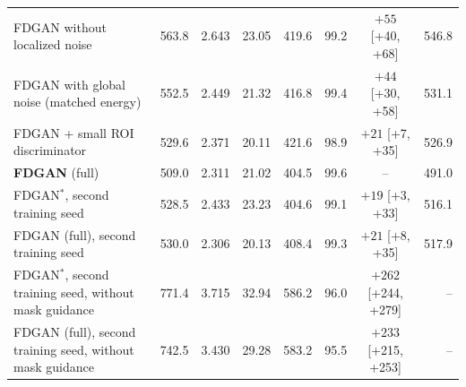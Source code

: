 \begin{center}
\begin{minipage}{\textwidth}
{\begin{tabular}{lrrrrrcr}
FDGAN without localized noise & 563.8 & 2.643 & 23.05 & 419.6 & 99.2 & $+55$ [+40, +68] & 546.8 \\
FDGAN with global noise (matched energy) & 552.5 & 2.449 & 21.32 & 416.8 & 99.4 & $+44$ [+30, +58] & 531.1 \\
FDGAN + small ROI discriminator & 529.6 & 2.371 & 20.11 & 421.6 & 98.9 & $+21$ [+7, +35] & 526.9 \\
\textbf{FDGAN} (full) & 509.0 & 2.311 & 21.02 & 404.5 & 99.6 & -- & 491.0 \\
FDGAN$^{\ast}$, second training seed & 528.5 & 2.433 & 23.23 & 404.6 & 99.1 & $+19$ [+3, +33] & 516.1 \\
FDGAN (full), second training seed & 530.0 & 2.306 & 20.13 & 408.4 & 99.3 & $+21$ [+8, +35] & 517.9 \\
FDGAN$^{\ast}$, second training seed, without mask guidance & 771.4 & 3.715 & 32.94 & 586.2 & 96.0 & $+262$ [+244, +279] & -- \\
FDGAN (full), second training seed, without mask guidance & 742.5 & 3.430 & 29.28 & 583.2 & 95.5 & $+233$ [+215, +253] & -- \\
\bottomrule
\end{tabular}}
\end{minipage}
\end{center}


